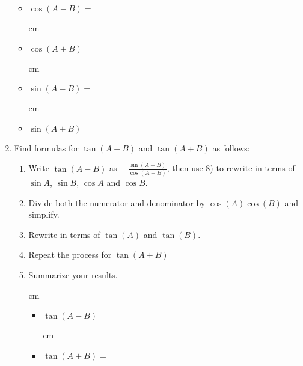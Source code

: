 \documentclass[number]{ximera}
\begin{document}
\begin{enumerate}
\begin{itemize}

\item $\cos(A-B) = $

 cm

\item $\cos(A+B) = $

 cm

\item $\sin(A-B) = $

 cm

\item $\sin(A+B) = $

\end{itemize}

\item Find formulas for $\tan (A-B)$ and $\tan (A+B)$ as follows:

\begin{enumerate}

\item Write $\tan (A-B)$ as $\quad \displaystyle{\frac{\sin (A-B)}{\cos (A-B)}}$, then use 8) to rewrite in terms of $\sin A$, $\sin B$, $\cos A$ and $\cos B$.

\item Divide both the numerator and denominator by $\cos (A) \cos(B)$ and simplify.

\item Rewrite in terms of $\tan (A)$ and $\tan(B)$. 

\item Repeat the process for $\tan (A+B)$

\item Summarize your results.

 cm

\begin{itemize}

\item $\tan(A-B) = $

 cm

\item $\tan(A+B) = $

\end{itemize}


\end{enumerate}

\end{enumerate}
\end{document}
